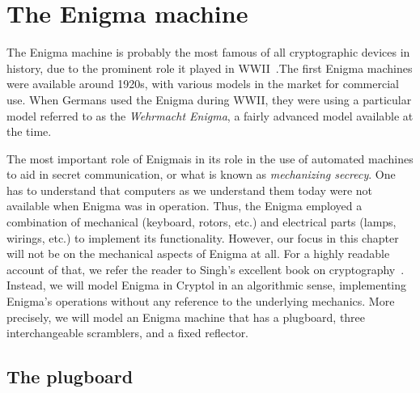 \chapter{The Enigma machine}
\label{chapter:enigma}

The Enigma machine is probably the most famous of all cryptographic
devices in history, due to the prominent role it played in
WWII~\cite{wiki:enigma}.\indEnigma The first Enigma machines were
available around 1920s, with various models in the market for
commercial use. When Germans used the Enigma during WWII, they were
using a particular model referred to as the {\em Wehrmacht Enigma}, a
fairly advanced model available at the time.

The most important role of Enigma\indEnigma is in its role in the use
of automated machines to aid in secret communication, or what is known
as \emph{mechanizing secrecy}.  One has to understand that computers
as we understand them today were not available when Enigma was in
operation. Thus, the Enigma employed a combination of mechanical
(keyboard, rotors, etc.)  and electrical parts (lamps, wirings, etc.)
to implement its functionality. However, our focus in this chapter
will not be on the mechanical aspects of Enigma at all. For a highly
readable account of that, we refer the reader to Singh's excellent
book on cryptography~\cite{Singh:1999:CBE}. Instead, we will model
Enigma in Cryptol in an algorithmic sense, implementing Enigma's
operations without any reference to the underlying mechanics. More
precisely, we will model an Enigma machine that has a plugboard, three
interchangeable scramblers, and a fixed reflector.



\section{The plugboard}
\label{sec:enigma:plugboard}


